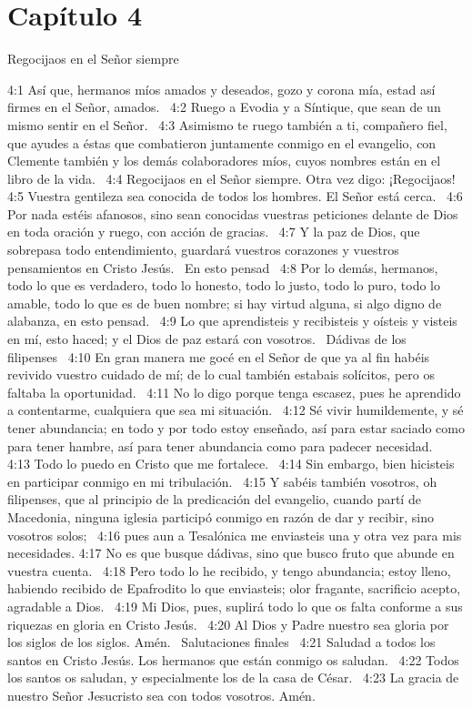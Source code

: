 \section*{Capítulo 4}
Regocijaos en el Señor siempre  

4:1 Así que, hermanos míos amados y deseados, gozo y corona mía, estad así firmes en el Señor, amados.  
4:2 Ruego a Evodia y a Síntique, que sean de un mismo sentir en el Señor.  
4:3 Asimismo te ruego también a ti, compañero fiel, que ayudes a éstas que combatieron juntamente conmigo en el evangelio, con Clemente también y los demás colaboradores míos, cuyos nombres están en el libro de la vida.  
4:4 Regocijaos en el Señor siempre. Otra vez digo: ¡Regocijaos!  
4:5 Vuestra gentileza sea conocida de todos los hombres. El Señor está cerca.  
4:6 Por nada estéis afanosos, sino sean conocidas vuestras peticiones delante de Dios en toda oración y ruego, con acción de gracias.  
4:7 Y la paz de Dios, que sobrepasa todo entendimiento, guardará vuestros corazones y vuestros pensamientos en Cristo Jesús.  
En esto pensad  
4:8 Por lo demás, hermanos, todo lo que es verdadero, todo lo honesto, todo lo justo, todo lo puro, todo lo amable, todo lo que es de buen nombre; si hay virtud alguna, si algo digno de alabanza, en esto pensad.  
4:9 Lo que aprendisteis y recibisteis y oísteis y visteis en mí, esto haced; y el Dios de paz estará con vosotros.  
Dádivas de los filipenses  
4:10 En gran manera me gocé en el Señor de que ya al fin habéis revivido vuestro cuidado de mí; de lo cual también estabais solícitos, pero os faltaba la oportunidad.  
4:11 No lo digo porque tenga escasez, pues he aprendido a contentarme, cualquiera que sea mi situación.  
4:12 Sé vivir humildemente, y sé tener abundancia; en todo y por todo estoy enseñado, así para estar saciado como para tener hambre, así para tener abundancia como para padecer necesidad.  
4:13 Todo lo puedo en Cristo que me fortalece.  
4:14 Sin embargo, bien hicisteis en participar conmigo en mi tribulación.  
4:15 Y sabéis también vosotros, oh filipenses, que al principio de la predicación del evangelio, cuando partí de Macedonia, ninguna iglesia participó conmigo en razón de dar y recibir, sino vosotros solos;  
4:16 pues aun a Tesalónica me enviasteis una y otra vez para mis necesidades. 
4:17 No es que busque dádivas, sino que busco fruto que abunde en vuestra cuenta.  
4:18 Pero todo lo he recibido, y tengo abundancia; estoy lleno, habiendo recibido de Epafrodito lo que enviasteis; olor fragante, sacrificio acepto, agradable a Dios.  
4:19 Mi Dios, pues, suplirá todo lo que os falta conforme a sus riquezas en gloria en Cristo Jesús.  
4:20 Al Dios y Padre nuestro sea gloria por los siglos de los siglos. Amén.  
Salutaciones finales  
4:21 Saludad a todos los santos en Cristo Jesús. Los hermanos que están conmigo os saludan.  
4:22 Todos los santos os saludan, y especialmente los de la casa de César.  
4:23 La gracia de nuestro Señor Jesucristo sea con todos vosotros. Amén.  